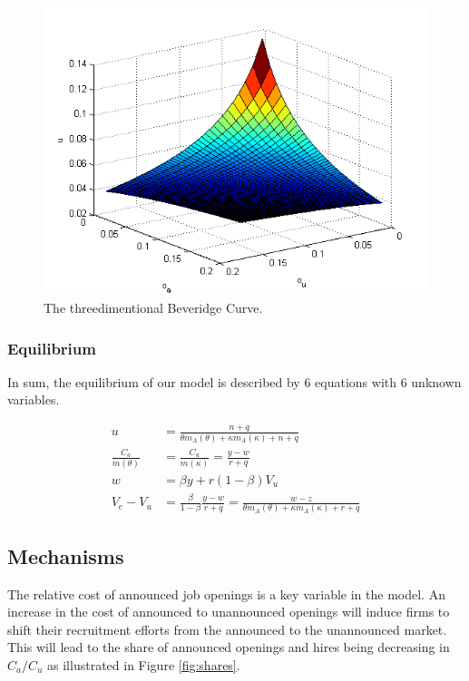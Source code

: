 \documentclass[11pt,article]{memoir}
\begin{document}
\begin{figure}
\includegraphics[width=\textwidth]{figures/BC_noeq}
\caption{The threedimentional Beveridge Curve.}
\end{figure}

\subsubsection{Equilibrium}
In sum, the equilibrium of our model is described by 6 equations with 6 unknown variables.


\begin{align}
u&=\frac{n+q}{\theta m_A \left( \theta \right)+\kappa m_A \left( \kappa \right)+n+q} \label{eq:eq_BC}\\
\frac{C_a}{m(\theta)}&=\frac{C_u}{m(\kappa)}=\frac{y-w}{r+q} \label{eq:eq_ld} \\
w&=\beta y + r(1-\beta)V_u \label{eq:eq_wage} \\
V_e-V_u&=\frac{\beta}{1-\beta}\frac{y-w}{r+q}=\frac{w-z}{\theta m_A \left( \theta \right)+\kappa m_A \left( \kappa \right)+r+q} \label{eq:eq_Ve_Vu}
\end{align}

\subsection{Mechanisms}

The relative cost of announced job openings is a key variable in the model. An increase in the cost of announced to unannounced openings will induce firms to shift their recruitment efforts from the announced to the unannounced market. This will lead to the share of announced openings and hires being decreasing in $C_a/C_u$ as illustrated in Figure \ref{fig:shares}. 
\end{document}
